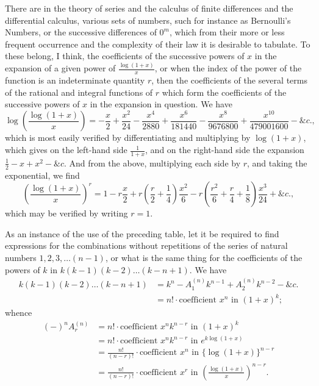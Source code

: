 \documentclass[11pt,a4paper]{book}
\begin{document}
There are in the theory of series and the calculus of finite differences and the differential calculus, various sets of numbers, such for instance as Bernoulli's Numbers, or the successive differences of $0^m$, which from their more or less frequent occurrence and the complexity of their law it is desirable to tabulate. To these belong, I think, the coefficients of the successive powers of $x$ in the expansion of a given power of $\frac{\log(1+x)}{x}$, or when the index of the power of the function is an indeterminate quantity $r$, then the coefficients of the several terms of the rational and integral functions of $r$ which form the coefficients of the successive powers of $x$ in the expansion in question. We have
\[
\log\left(\frac{\log(1+x)}{x}\right) = -\frac{x}{2} + \frac{x^2}{24} - \frac{x^4}{2880} + \frac{x^6}{181440} - \frac{x^8}{9676800} + \frac{x^{10}}{479001600} - \&c.,
\]
which is most easily verified by differentiating and multiplying by $\log(1+x)$, which gives on the left-hand side $\frac{1}{1+x}$, and on the right-hand side the expansion $\tfrac{1}{2} - x + x^2 - \&c$. And from the above, multiplying each side by $r$, and taking the exponential, we find
\[
\left(\frac{\log(1+x)}{x}\right)^r = 1 - r\frac{x}{2} + r\left(\frac{r}{2} + \frac{1}{4}\right)\frac{x^2}{6} - r\left(\frac{r^2}{6} + \frac{r}{4} + \frac{1}{8}\right)\frac{x^3}{24} + \&c.,
\]
which may be verified by writing $r = 1$.

As an instance of the use of the preceding table, let it be required to find expressions for the combinations without repetitions of the series of natural numbers $1, 2, 3, \ldots(n-1)$, or what is the same thing for the coefficients of the powers of $k$ in $k(k-1)(k-2)\ldots(k-n+1)$. We have
\begin{align*}
k(k-1)(k-2)\ldots(k-n+1) &= k^n - A_1^{(n)}k^{n-1} + A_2^{(n)}k^{n-2} - \&c.\\
&= n!\cdot\text{coefficient }x^n\text{ in }(1+x)^k;
\end{align*}
whence
\begin{align*}
(-)^nA_r^{(n)} &= n!\cdot\text{coefficient }x^nk^{n-r}\text{ in }(1+x)^k\\
&= n!\cdot\text{coefficient }x^nk^{n-r}\text{ in }e^{k\log(1+x)}\\
&= \frac{n!}{(n-r)!}\cdot\text{coefficient }x^n\text{ in }\{\log(1+x)\}^{n-r}\\
&= \frac{n!}{(n-r)!}\cdot\text{coefficient }x^r\text{ in }\left(\frac{\log(1+x)}{x}\right)^{n-r}.
\end{align*}
\end{document}
